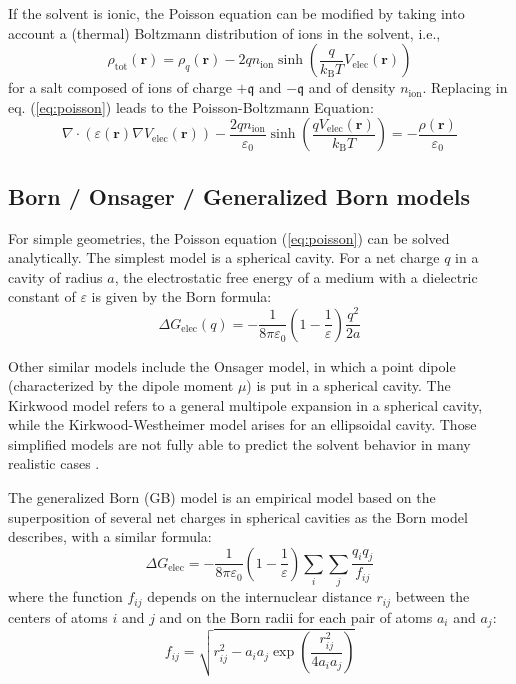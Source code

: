 If the solvent is ionic, the Poisson equation can be modified by taking
into account a (thermal) Boltzmann distribution of ions in the solvent,
i.e.,
\begin{equation}
\rho_{\mathrm{tot}}(\mathbf{r})=\rho_{q}(\mathbf{r})-2qn_{\mathrm{ion}}\sinh(\frac{q}{k_{\mathrm{B}}T}V_{\mathrm{elec}}(\mathbf{r}))
\end{equation}
for a salt composed of ions of charge $+\mathfrak{q}$ and $-\mathfrak{q}$
and of density $n_{\mathrm{ion}}$. Replacing in eq. (\ref{eq:poisson})
leads to the Poisson-Boltzmann Equation:
\begin{equation}
\nabla\cdot(\varepsilon(\mathbf{r})\nabla V_{\mathrm{elec}}(\mathbf{r}))-\dfrac{2qn_{\mathrm{ion}}}{\varepsilon_{0}}\sinh\left(\dfrac{qV_{\mathrm{elec}}(\mathbf{r})}{k_{\mathrm{B}}T}\right)=-\dfrac{\rho(\mathbf{r})}{\varepsilon_{0}}
\end{equation}


\subsection{Born / Onsager / Generalized Born models\label{subsec:Born-/-Onsager}}

For simple geometries, the Poisson equation (\ref{eq:poisson}) can
be solved analytically. The simplest model is a spherical cavity.
For a net charge $q$ in a cavity of radius $a$, the electrostatic
free energy of a medium with a dielectric constant of $\varepsilon$
is given by the Born formula:
\begin{equation}
\Delta G_{\mathrm{elec}}(q)=-\dfrac{1}{8\pi\varepsilon_{0}}\left(1-\frac{1}{\varepsilon}\right)\frac{q^{2}}{2a}\label{eq:born_model}
\end{equation}

Other similar models include the Onsager model, in which a point dipole
(characterized by the dipole moment $\mu$) is put in a spherical
cavity. The Kirkwood model refers to a general multipole expansion
in a spherical cavity, while the Kirkwood-Westheimer model arises
for an ellipsoidal cavity. Those simplified models are not fully able
to predict the solvent behavior in many realistic cases \citep{Jensen}. 

The generalized Born (GB) model is an empirical model based on the
superposition of several net charges in spherical cavities as the
Born model describes, with a similar formula:
\begin{equation}
\Delta G_{\mathrm{elec}}=-\dfrac{1}{8\pi\varepsilon_{0}}\left(1-\frac{1}{\varepsilon}\right)\sum_{i}\sum_{j}\frac{q_{i}q_{j}}{f_{ij}}
\end{equation}
where the function $f_{ij}$ depends on the internuclear distance
$r_{ij}$ between the centers of atoms $i$ and $j$ and on the Born
radii for each pair of atoms $a_{i}$ and $a_{j}$:
\begin{equation}
f_{ij}=\sqrt{r_{ij}^{2}-a_{i}a_{j}\exp\left(\frac{r_{ij}^{2}}{4a_{i}a_{j}}\right)}
\end{equation}


